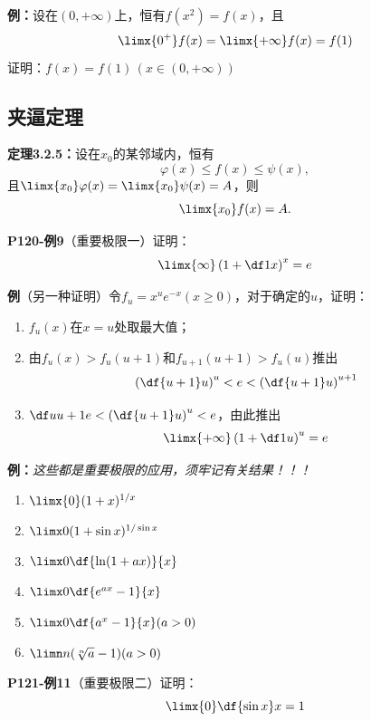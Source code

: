 {\bf 例：}设在$(0,+\infty)$上，恒有$f(x^2)=f(x)$，且
$$\limx{0^+}f(x)=\limx{+\infty}f(x)=f(1)$$
证明：$f(x)=f(1)\,(x\in(0,+\infty))$

\subsection{夹逼定理}

{\bf 定理3.2.5：}设在$x_0$的某邻域内，恒有
$$\varphi(x)\leq f(x)\leq\psi(x), $$
且$\limx{x_0}\varphi(x)=\limx{x_0}\psi(x)=A$，则
$$\limx{x_0}f(x)=A.$$

{\bf P120-例9}（重要极限一）证明：
$$\limx{\infty}\left(1+\df 1x\right)^x=e$$

\begin{shaded}
{\bf 例}（另一种证明）令$f_u=x^ue^{-x}(x\geq 0)$，对于确定的$u$，证明：
\begin{enumerate}[(1)]
  \setlength{\itemindent}{1cm}
  \item $f_u(x)$在$x=u$处取最大值；
  \item 由$f_u(x)>f_u(u+1)$和$f_{u+1}(u+1)>f_u(u)$推出
  $$\left(\df{u+1}u\right)^u<e<\left(\df{u+1}u\right)^{u+1}$$
  \item $\df u{u+1}e<\left(\df{u+1}u\right)^u<e$，由此推出
  $$\limx{+\infty}\left(1+\df 1u\right)^u=e$$
\end{enumerate}
\end{shaded}

{\bf 例：}{\it 这些都是重要极限的应用，须牢记有关结果！！！}
\begin{enumerate}[(1)]
  \setlength{\itemindent}{1cm}
  \item $\limx{0}(1+x)^{1/x}$ 
  \item $\limx 0(1+\sin x)^{1/\sin x}$ 
  \item $\limx 0\df{\ln(1+ax)}{x}$
  \item $\limx 0\df{e^{ax}-1}{x}$ 
  \item $\limx 0\df{a^x-1}{x}(a>0)$ 
  \item $\limn n(\sqrt[n]{a}-1) (a>0)$ 
\end{enumerate}

{\bf P121-例11}（重要极限二）证明：
$$\limx{0}\df {\sin x}x=1$$

